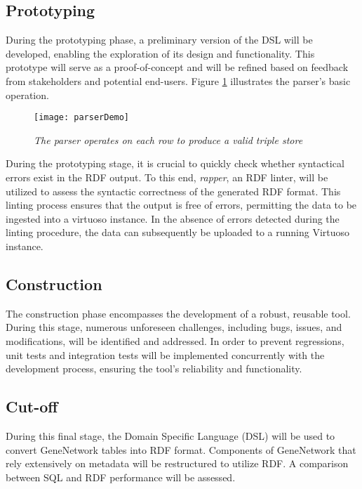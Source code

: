 \subsection{Prototyping}

During the prototyping phase, a preliminary version of the DSL will be developed, enabling the exploration of its design and functionality.  This prototype will serve as a proof-of-concept and will be refined based on feedback from stakeholders and potential end-users.  Figure \ref{fig:parser-demo} illustrates the parser's basic operation.

\begin{figure}[H]
\centering
\texttt{[image: parserDemo]}
\caption{\textit{The parser operates on each row to produce a valid triple store}}
\label{fig:parser-demo}
\centering
\end{figure}

During the prototyping stage, it is crucial to quickly check whether syntactical errors exist in the RDF output.  To this end, \textit{rapper}, an RDF linter, will be utilized to assess the syntactic correctness of the generated RDF format.  This linting process ensures that the output is free of errors, permitting the data to be ingested into a virtuoso instance.  In the absence of errors detected during the linting procedure, the data can subsequently be uploaded to a running Virtuoso instance.

\subsection{Construction}

The construction phase encompasses the development of a robust, reusable tool.  During this stage, numerous unforeseen challenges, including bugs, issues, and modifications, will be identified and addressed.  In order to prevent regressions, unit tests and integration tests will be implemented concurrently with the development process, ensuring the tool's reliability and functionality.

\subsection{Cut-off}

During this final stage, the Domain Specific Language (DSL) will be used to convert GeneNetwork tables into RDF format.  Components of GeneNetwork that rely extensively on metadata will be restructured to utilize RDF.  A comparison between SQL and RDF performance will be assessed.

